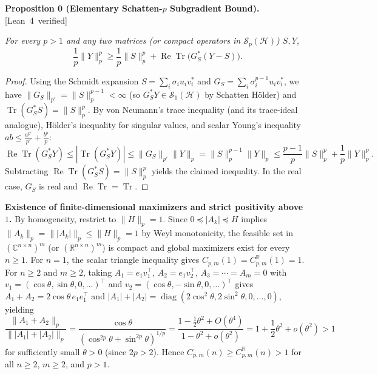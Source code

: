 \documentclass[10pt,letterpaper]{article}
\newcommand{\leanbadge}[1]{\mbox{\sffamily\scriptsize\color{leanborder}[#1]}}
\newcommand{\C}{\mathbb{C}}
\newcommand{\R}{\mathbb{R}}
\newcommand{\Hilb}{\mathcal{H}}
\newcommand{\Sp}{\mathcal{S}_p}
\newcommand{\Tr}{\operatorname{Tr}}
\newcommand{\diag}{\operatorname{diag}}
\begin{document}
\begin{tcolorbox}[lemmabox]
\textbf{Proposition 0 (Elementary Schatten-$p$ Subgradient Bound).}\hfill\leanbadge{Lean~4 verified}\par\vspace{1.5pt}
\emph{For every $p > 1$ and any two matrices (or compact operators in $\Sp(\Hilb)$) $S, Y$,}
\[
  \frac{1}{p}\|Y\|_p^p \ge \frac{1}{p}\|S\|_p^p + \operatorname{Re}\Tr\bigl(G_S^*(Y - S)\bigr).
\]
\end{tcolorbox}

\begin{proof}
Using the Schmidt expansion $S = \sum_i \sigma_i u_i v_i^*$ and $G_S = \sum_i \sigma_i^{p-1} u_i v_i^*$, we have $\|G_S\|_{p'} = \|S\|_p^{p-1} < \infty$ (so $G_S^* Y \in \mathcal{S}_1(\Hilb)$ by Schatten H\"older) and $\Tr(G_S^* S) = \|S\|_p^p$. By von Neumann's trace inequality (and its trace-ideal analogue), H\"older's inequality for singular values, and scalar Young's inequality $ab \le \frac{a^{p'}}{p'} + \frac{b^p}{p}$:
\[
  \operatorname{Re}\Tr(G_S^* Y) \le |\Tr(G_S^* Y)| \le \|G_S\|_{p'}\|Y\|_p = \|S\|_p^{p-1}\|Y\|_p \le \frac{p-1}{p}\|S\|_p^p + \frac{1}{p}\|Y\|_p^p.
\]
Subtracting $\operatorname{Re}\Tr(G_S^* S) = \|S\|_p^p$ yields the claimed inequality. In the real case, $G_S$ is real and $\operatorname{Re}\Tr = \Tr$.
\end{proof}

\textbf{Existence of finite-dimensional maximizers and strict positivity above~$1$.}
By homogeneity, restrict to $\|H\|_p = 1$. Since $0 \preceq |A_k| \preceq H$ implies $\|A_k\|_p = \||A_k|\|_p \le \|H\|_p = 1$ by Weyl monotonicity, the feasible set in $(\C^{n\times n})^m$ (or $(\R^{n\times n})^m$) is compact and global maximizers exist for every $n \ge 1$. For $n = 1$, the scalar triangle inequality gives $C_{p,m}(1) = C_{p,m}^{\R}(1) = 1$. For $n \ge 2$ and $m \ge 2$, taking $A_1 = e_1 v_1^\top$, $A_2 = e_1 v_2^\top$, $A_3 = \cdots = A_m = 0$ with $v_1 = (\cos\theta, \sin\theta, 0,\dots)^\top$ and $v_2 = (\cos\theta, -\sin\theta, 0,\dots)^\top$ gives $A_1 + A_2 = 2\cos\theta\,e_1 e_1^\top$ and $|A_1|+|A_2| = \diag(2\cos^2\theta, 2\sin^2\theta, 0,\dots,0)$, yielding
\[
  \frac{\|A_1 + A_2\|_p}{\||A_1| + |A_2|\|_p}
  = \frac{\cos\theta}{(\cos^{2p}\theta + \sin^{2p}\theta)^{1/p}}
  = \frac{1 - \frac{1}{2}\theta^2 + O(\theta^4)}{1 - \theta^2 + o(\theta^2)}
  = 1 + \frac{1}{2}\theta^2 + o(\theta^2) > 1
\]
for sufficiently small $\theta > 0$ (since $2p > 2$). Hence $C_{p,m}(n) \ge C_{p,m}^{\R}(n) > 1$ for all $n \ge 2$, $m \ge 2$, and $p > 1$.
\end{document}
